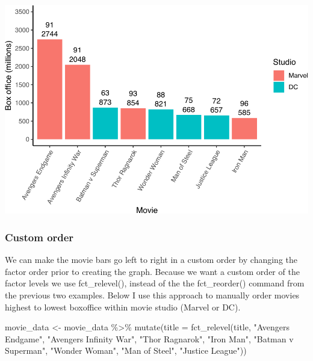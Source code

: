\documentclass[
]{krantz}
\makeatletter
\newenvironment{Shaded}{\begin{snugshade}}{\end{snugshade}}
\newcommand{\AttributeTok}[1]{\textcolor[rgb]{0.61,0.61,0.61}{#1}}
\newcommand{\FunctionTok}[1]{\textcolor[rgb]{0,0,0}{#1}}
\newcommand{\NormalTok}[1]{#1}
\newcommand{\OtherTok}[1]{\textcolor[rgb]{0.37,0.37,0.37}{#1}}
\newcommand{\SpecialCharTok}[1]{\textcolor[rgb]{0,0,0}{#1}}
\newcommand{\StringTok}[1]{\textcolor[rgb]{0.5,0.5,0.5}{#1}}
\newenvironment{kframe}{%
\medskip{}
\setlength{\fboxsep}{.8em}
 \def\at@end@of@kframe{}%
 \ifinner\ifhmode%
  \def\at@end@of@kframe{\end{minipage}}%
  \begin{minipage}{\columnwidth}%
 \fi\fi%
 \def\FrameCommand##1{\hskip\@totalleftmargin \hskip-\fboxsep
 \colorbox{shadecolor}{##1}\hskip-\fboxsep
     \hskip-\linewidth \hskip-\@totalleftmargin \hskip\columnwidth}%
 \MakeFramed {\advance\hsize-\width
   \@totalleftmargin\z@ \linewidth\hsize
   \@setminipage}}%
 {\par\unskip\endMakeFramed%
 \at@end@of@kframe}
\renewenvironment{Shaded}{\begin{kframe}}{\end{kframe}}
\makeatother
\begin{document}
\includegraphics[width=0.65\linewidth]{bookdown_files/figure-latex/unnamed-chunk-219-1}

\hypertarget{custom-order}{%
\subsubsection{Custom order}\label{custom-order}}

We can make the movie bars go left to right in a custom order by changing the factor order prior to creating the graph. Because we want a custom order of the factor levels we use fct\_relevel(), instead of the the fct\_reorder() command from the previous two examples. Below I use this approach to manually order movies highest to lowest boxoffice within movie studio (Marvel or DC).

\begin{Shaded}
\begin{Highlighting}[]
\NormalTok{movie\_data }\OtherTok{\textless{}{-}}\NormalTok{ movie\_data }\SpecialCharTok{\%\textgreater{}\%} 
  \FunctionTok{mutate}\NormalTok{(}\AttributeTok{title =} \FunctionTok{fct\_relevel}\NormalTok{(title,}
                             \StringTok{"Avengers Endgame"}\NormalTok{,}
                             \StringTok{"Avengers Infinity War"}\NormalTok{,}
                             \StringTok{"Thor Ragnarok"}\NormalTok{,}
                             \StringTok{"Iron Man"}\NormalTok{,}
                             \StringTok{"Batman v Superman"}\NormalTok{,}
                             \StringTok{"Wonder Woman"}\NormalTok{,}
                             \StringTok{"Man of Steel"}\NormalTok{,}
                             \StringTok{"Justice League"}\NormalTok{))}
\end{Highlighting}
\end{Shaded}
\end{document}
